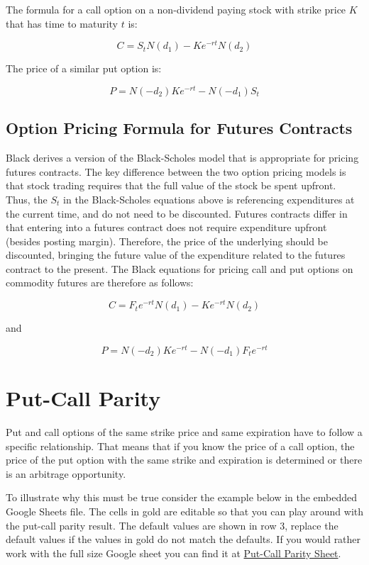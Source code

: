 \documentclass[
]{book}
\begin{document}
The formula for a call option on a non-dividend paying stock with strike price \(K\) that has time to maturity \(t\) is:

\[C = S_{t}N(d_{1}) - K e^{-rt} N(d_{2})\]

The price of a similar put option is:

\[
P = N(-d_{2}) K e^{-rt} - N(-d_{1}) S_{t}
\]

\hypertarget{option-pricing-formula-for-futures-contracts}{%
\subsection{Option Pricing Formula for Futures Contracts}\label{option-pricing-formula-for-futures-contracts}}

Black \citeyearpar{black_pricing_1976} derives a version of the Black-Scholes model that is appropriate for pricing futures contracts. The key difference between the two option pricing models is that stock trading requires that the full value of the stock be spent upfront. Thus, the \(S_{t}\) in the Black-Scholes equations above is referencing expenditures at the current time, and do not need to be discounted. Futures contracts differ in that entering into a futures contract does not require expenditure upfront (besides posting margin). Therefore, the price of the underlying should be discounted, bringing the future value of the expenditure related to the futures contract to the present. The Black equations for pricing call and put options on commodity futures are therefore as follows:

\[
C = F_{t} e^{-rt} N(d_{1}) - K e^{-rt} N(d_{2})
\]

and

\[
P = N(-d_{2}) K e^{-rt} - N(-d_{1}) F_{t} e^{-rt}
\]

\hypertarget{put-call-parity}{%
\section{Put-Call Parity}\label{put-call-parity}}

Put and call options of the same strike price and same expiration have to follow a specific relationship. That means that if you know the price of a call option, the price of the put option with the same strike and expiration is determined or there is an arbitrage opportunity.

To illustrate why this must be true consider the example below in the embedded Google Sheets file. The cells in gold are editable so that you can play around with the put-call parity result. The default values are shown in row 3, replace the default values if the values in gold do not match the defaults. If you would rather work with the full size Google sheet you can find it at \href{https://docs.google.com/spreadsheets/d/1ivvTGqC9R4L3zkG8c4ApDg8dC1LHj4v_8uLjgiurxX0/edit?usp=sharing}{Put-Call Parity Sheet}.
\end{document}
